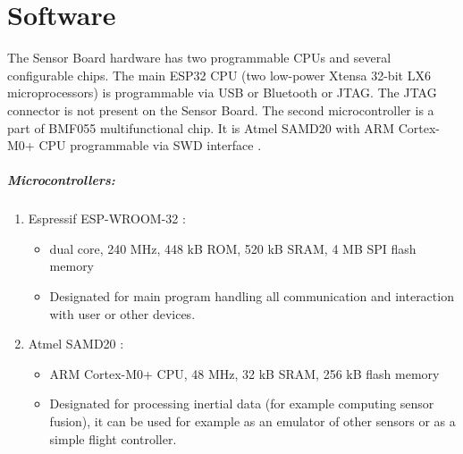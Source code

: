 \chapter{Software}
The Sensor Board hardware has two programmable CPUs and several configurable chips. The main ESP32 CPU (two low-power Xtensa 32-bit LX6 microprocessors) \cite{espressif:ESP-WROOM-32} is programmable via USB or Bluetooth or \ac{JTAG}. The \ac{JTAG} connector is not present on the Sensor Board. The second microcontroller is a part of BMF055 \cite{bosch:BMF055} multifunctional chip. It is Atmel SAMD20 \cite{atmel:samd20} with ARM Cortex-M0+ CPU programmable via \ac{SWD} interface \cite{SWDinterface}.

\paragraph{Microcontrollers:}
\begin{enumerate}
	\item Espressif ESP-WROOM-32 \cite{espressif:ESP-WROOM-32}:
	\begin{itemize}
		\item dual core, 240 MHz, 448 kB ROM, 520 kB SRAM, 4 MB SPI flash memory
		\item Designated for main program handling all communication and interaction with user or other devices.
	\end{itemize}
	\item Atmel SAMD20 \cite{atmel:samd20}:
	\begin{itemize}
		\item ARM Cortex-M0+ CPU, 48 MHz, 32 kB SRAM, 256 kB flash memory
		\item Designated for processing inertial data (for example computing sensor fusion), it can be used for example as an emulator of other sensors or as a simple flight controller.
	\end{itemize}
\end{enumerate}

